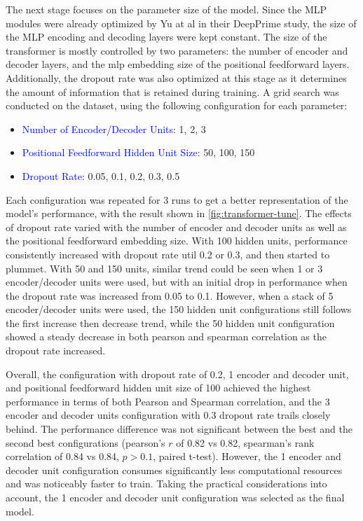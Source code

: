 The next stage focuses on the parameter size of the model. Since the MLP modules were already optimized by Yu at al in their DeepPrime study, the size of the MLP encoding and decoding layers were kept constant. The size of the transformer is mostly controlled by two parameters: the number of encoder and decoder layers, and the mlp embedding size of the positional feedforward layers. Additionally, the dropout rate was also optimized at this stage as it determines the amount of information that is retained during training. A grid search was conducted on the dataset, using the following configuration for each parameter:

\begin{itemize}[itemsep=-0mm]
    \item \textcolor{blue}{Number of Encoder/Decoder Units}: 1, 2, 3
    \item \textcolor{blue}{Positional Feedforward Hidden Unit Size}: 50, 100, 150
    \item \textcolor{blue}{Dropout Rate}: 0.05, 0.1, 0.2, 0.3, 0.5
\end{itemize}

Each configuration was repeated for 3 runs to get a better representation of the model's performance, with the result shown in \autoref{fig:transformer-tune}. 
The effects of dropout rate varied with the number of encoder and decoder units as well as the positional feedforward embedding size. With 100 hidden units, performance consistently increased with dropout rate util 0.2 or 0.3, and then started to plummet. With 50 and 150 units, similar trend could be seen when 1 or 3 encoder/decoder units were used, but with an initial drop in performance when the dropout rate was increased from 0.05 to 0.1. However, when a stack of 5 encoder/decoder units were used, the 150 hidden unit configurations still follows the first increase then decrease trend, while the 50 hidden unit configuration showed a steady decrease in both pearson and spearman correlation as the dropout rate increased.

Overall, the configuration with dropout rate of 0.2, 1 encoder and decoder unit, and positional feedforward hidden unit size of 100 achieved the highest performance in terms of both Pearson and Spearman correlation, and the 3 encoder and decoder units configuration with 0.3 dropout rate trails closely behind. The performance difference was not significant between the best and the second best configurations (pearson's $r$ of 0.82 vs 0.82, spearman's rank correlation of 0.84 vs 0.84, $p>0.1$, paired t-test). However, the 1 encoder and decoder unit configuration consumes significantly less computational resources and was noticeably faster to train. Taking the practical considerations into account, the 1 encoder and decoder unit configuration was selected as the final model.

